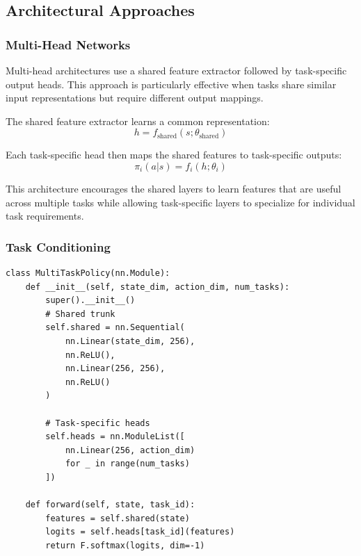 \documentclass[12pt]{article}
\begin{document}
{{{\subsection{Architectural Approaches}

\subsubsection{Multi-Head Networks}

Multi-head architectures use a shared feature extractor followed by task-specific output heads. This approach is particularly effective when tasks share similar input representations but require different output mappings.

The shared feature extractor learns a common representation:
\begin{equation}
h = f_{\text{shared}}(s; \theta_{\text{shared}})
\end{equation}

Each task-specific head then maps the shared features to task-specific outputs:
\begin{equation}
\pi_i(a|s) = f_i(h; \theta_i)
\end{equation}

This architecture encourages the shared layers to learn features that are useful across multiple tasks while allowing task-specific layers to specialize for individual task requirements.

\subsubsection{Task Conditioning}

\begin{verbatim}
class MultiTaskPolicy(nn.Module):
    def __init__(self, state_dim, action_dim, num_tasks):
        super().__init__()
        # Shared trunk
        self.shared = nn.Sequential(
            nn.Linear(state_dim, 256),
            nn.ReLU(),
            nn.Linear(256, 256),
            nn.ReLU()
        )
        
        # Task-specific heads
        self.heads = nn.ModuleList([
            nn.Linear(256, action_dim) 
            for _ in range(num_tasks)
        ])
    
    def forward(self, state, task_id):
        features = self.shared(state)
        logits = self.heads[task_id](features)
        return F.softmax(logits, dim=-1)
\end{verbatim}

}}}
\end{document}
